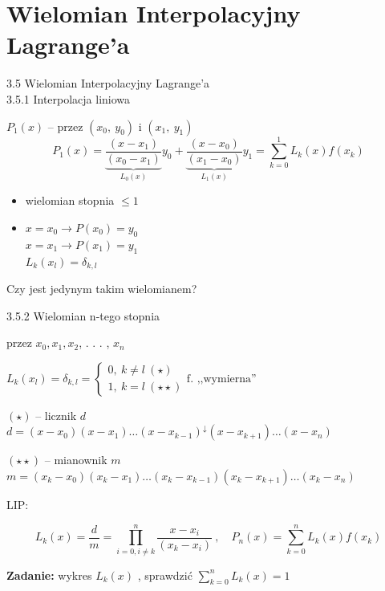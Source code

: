 \section{Wielomian Interpolacyjny Lagrange'a}

\begin{frame}{3.5 Wielomian Interpolacyjny Lagrange'a \\ 3.5.1 Interpolacja liniowa}


$P_{1}(x)$ -- przez $(x_{0},\ y_{0})$ i $(x_{1},\ y_{1})$
$$
P_{1}(x)=\underbrace{\frac{(x-x_{1})}{(x_{0}-x_{1})}}_{L_0(x)}y_{0}+\underbrace{\frac{(x-x_{0})}{(x_{1}-x_{0})}}_{L_1(x)}y_{1}=\sum_{k=0}^{1}L_{k}(x)f(x_{k})
$$
\begin{itemize}
\item wielomian stopnia $\leq 1$

\item $x=x_{0}\rightarrow P(x_{0})=y_{0}$ \\
$x=x_{1}\rightarrow P(x_{1})=y_{1}$ \\
$L_{k}(x_{l})=\delta_{k,l}$ \\
\end{itemize}
\begin{flushright}Czy jest jedynym takim wielomianem?\end{flushright}

\end{frame}


\begin{frame}{3.5.2 Wielomian $\mathrm{n}$-tego stopnia}


przez $x_{0}, x_{1}, x_{2}$, . . . , $x_{n}$

$L_{k}(x_{l})=\delta_{k,l}=\left\{\begin{array}{l}
0,\ k\neq l\ (\star)\ \\
1,\ k=l\ (\star\star)
\end{array}\right. \text{f. ,,wymierna''} $

$(\star)$ -- licznik $d$
$d=(x-x_{0})(x-x_{1})\ldots(x-x_{k-1})^{\downarrow}(x-x_{k+1})\ldots(x-x_{n})$

$(\star\star)$ -- mianownik $m$
$m=(x_{k}-x_{0})(x_{k}-x_{1})\ldots(x_{k}-x_{k-1})(x_{k}-x_{k+1})\ldots(x_{k}-x_{n})$

LIP:

$$L_{k}(x) = \frac{d}{m} = \prod_{i=0,i\neq k}^{n}\frac{x-x_{i}}{(x_{k}-x_{i})}\ , \quad P_{n}(x)=\sum_{k=0}^{n}L_{k}(x)f(x_{k})$$

\textbf{Zadanie:} wykres $L_{k}(x)$ , sprawdzić $\displaystyle \sum_{k=0}^{n}L_{k}(x)=1$
\end{frame}


